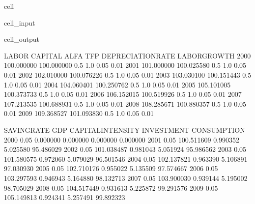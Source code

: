 \documentclass[letterpaper,10pt,english]{jupyterBook}
\begin{document}
\begin{sphinxuseclass}{cell}\begin{sphinxVerbatimInput}

\begin{sphinxuseclass}{cell_input}
\begin{sphinxVerbatim}[commandchars=\\\{\}]
   

\end{sphinxVerbatim}

\end{sphinxuseclass}\end{sphinxVerbatimInput}
\begin{sphinxVerbatimOutput}

\begin{sphinxuseclass}{cell_output}
\begin{sphinxVerbatim}[commandchars=\\\{\}]
           LABOR     CAPITAL  ALFA  TFP  DEPRECIATION\PYGZus{}RATE  LABOR\PYGZus{}GROWTH  \PYGZbs{}
2000  100.000000  100.000000   0.5  1.0               0.05          0.01   
2001  101.000000  100.025580   0.5  1.0               0.05          0.01   
2002  102.010000  100.076226   0.5  1.0               0.05          0.01   
2003  103.030100  100.151443   0.5  1.0               0.05          0.01   
2004  104.060401  100.250762   0.5  1.0               0.05          0.01   
2005  105.101005  100.373733   0.5  1.0               0.05          0.01   
2006  106.152015  100.519926   0.5  1.0               0.05          0.01   
2007  107.213535  100.688931   0.5  1.0               0.05          0.01   
2008  108.285671  100.880357   0.5  1.0               0.05          0.01   
2009  109.368527  101.093830   0.5  1.0               0.05          0.01   

      SAVING\PYGZus{}RATE         GDP  CAPITAL\PYGZus{}INTENSITY  INVESTMENT  CONSUMPTION  
2000         0.05    0.000000           0.000000    0.000000     0.000000  
2001         0.05  100.511609           0.990352    5.025580    95.486029  
2002         0.05  101.038487           0.981043    5.051924    95.986562  
2003         0.05  101.580575           0.972060    5.079029    96.501546  
2004         0.05  102.137821           0.963390    5.106891    97.030930  
2005         0.05  102.710176           0.955022    5.135509    97.574667  
2006         0.05  103.297593           0.946943    5.164880    98.132713  
2007         0.05  103.900030           0.939144    5.195002    98.705029  
2008         0.05  104.517449           0.931613    5.225872    99.291576  
2009         0.05  105.149813           0.924341    5.257491    99.892323  
\end{sphinxVerbatim}

\end{sphinxuseclass}\end{sphinxVerbatimOutput}

\end{sphinxuseclass}
\end{document}
